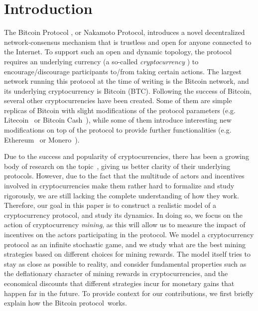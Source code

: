 
\section{Introduction}

The Bitcoin Protocol \cite{Bitcoin,DBLP:books/daglib/0040621,NC17}, or Nakamoto Protocol, introduces a novel decentralized network-consensus mechanism that is trustless and open for anyone connected to the Internet. To support such an open and dynamic topology, the protocol requires an underlying currency (a so-called \emph{cryptocurrency} \cite{NC17}) to encourage/discourage participants to/from taking certain actions. The largest network running this protocol at the time of writing is the Bitcoin network, and its underlying cryptocurrency is Bitcoin (BTC). Following the success of Bitcoin, several other cryptocurrencies have been created. Some of them are simple replicas of Bitcoin with slight modifications of the protocol parameters (e.g. Litecoin~\cite{Litecoin} or Bitcoin Cash~\cite{Bcash}), while some of them introduce interesting new modifications on top of the protocol to provide further functionalities (e.g. Ethereum~\cite{Ethereum,E17} or Monero~\cite{Monero}).

Due to the success and popularity of cryptocurrencies, there has been a growing body of research on the topic~\cite{mininggames:2016,optimalselfishmining2017,instabilitywithoutreward:2016,selfishmining2014,stop_selfish_mining2014,eclipseattacks2015,LBSZR15,LJG15,stubborn_mining:2016,economics_of_mining2013,ZGR17,ABLZ17,MHG18,SZWTK18}, giving us better clarity of their underlying protocols. However, due to the fact that the multitude of actors and incentives involved in cryptocurrencies make them rather hard to formalize and study rigorously, we are still lacking the complete understanding of how they work. Therefore, our goal in this paper is to construct a realistic model of a cryptocurrency protocol, and study its dynamics. In doing so, we focus on the action of cryptocurrency \emph{mining}, as this will allow us to measure the impact of incentives on the actors participating in the protocol. We model a cryptocurrency protocol as an infinite stochastic game, and we study what are the best mining strategies based on different choices for mining rewards. The model itself tries to stay as close as possible to reality, and consider 
fundamental properties such as the deflationary character of mining rewards in cryptocurrencies, and the economical discounts that different strategies incur for monetary gains that happen far in the future.
To provide context for our contributions, we first briefly explain how the Bitcoin protocol~works.


